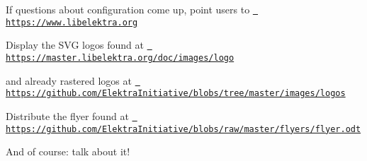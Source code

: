 \begin{DoxyItemize}
\item If questions about configuration come up, point users to \href{https://www.libelektra.org}{\texttt{ https\+://www.\+libelektra.\+org}}
\item Display the S\+VG logos found at \href{https://master.libelektra.org/doc/images/logo}{\texttt{ https\+://master.\+libelektra.\+org/doc/images/logo}}
\item and already rastered logos at \href{https://github.com/ElektraInitiative/blobs/tree/master/images/logos}{\texttt{ https\+://github.\+com/\+Elektra\+Initiative/blobs/tree/master/images/logos}}
\item Distribute the flyer found at \href{https://github.com/ElektraInitiative/blobs/raw/master/flyers/flyer.odt}{\texttt{ https\+://github.\+com/\+Elektra\+Initiative/blobs/raw/master/flyers/flyer.\+odt}}
\item And of course\+: talk about it! 
\end{DoxyItemize}